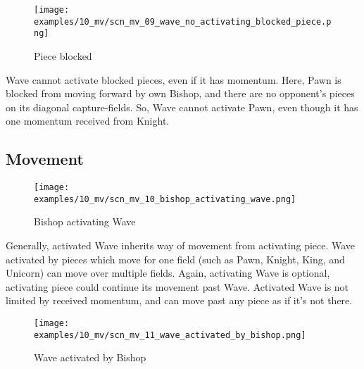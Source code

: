 \vspace*{-1.4\baselineskip}
\noindent
\begin{figure}[h]
\texttt{[image: examples/10\_mv/scn\_mv\_09\_wave\_no\_activating\_blocked\_piece.png]}
\caption{Piece blocked}
\label{fig:scn_mv_09_wave_no_activating_blocked_piece}
\end{figure}

Wave cannot activate blocked pieces, even if it has momentum. Here, Pawn is blocked
from moving forward by own Bishop, and there are no opponent's pieces on its
diagonal capture-fields. So, Wave cannot activate Pawn, even though it has one
momentum received from Knight.

\clearpage %

\subsection*{Movement}
\label{sec:Miranda's veil/Wave/Movement}

\vspace*{-1.4\baselineskip}
\noindent
\begin{figure}[h]
\texttt{[image: examples/10\_mv/scn\_mv\_10\_bishop\_activating\_wave.png]}
\caption{Bishop activating Wave}
\label{fig:scn_mv_10_bishop_activating_wave}
\end{figure}

Generally, activated Wave inherits way of movement from activating piece. Wave activated
by pieces which move for one field (such as Pawn, Knight, King, and Unicorn) can move
over multiple fields. Again, activating Wave is optional, activating piece could continue
its movement past Wave. Activated Wave is not limited by received momentum, and can move
past any piece as if it's not there.

\clearpage %

\vspace*{-2.1\baselineskip}
\noindent
\begin{figure}[!h]
\texttt{[image: examples/10\_mv/scn\_mv\_11\_wave\_activated\_by\_bishop.png]}
\caption{Wave activated by Bishop}
\label{fig:scn_mv_11_wave_activated_by_bishop}
\end{figure}

